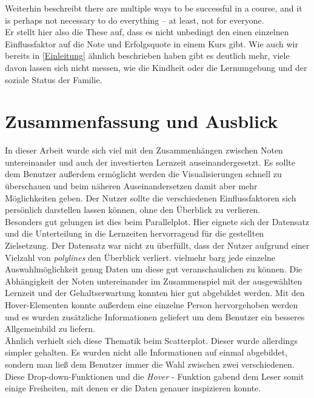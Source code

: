 \documentclass[usegeometry=true]{scrartcl}
\begin{document}
\noindent Weiterhin beschreibt \cite{Xu14, page 2}\: \glqq [...] there are multiple ways to be
successful in a course, and it is perhaps not necessary to do
everything – at least, not for everyone\grqq .\\
Er stellt hier also die These auf, dass es nicht unbedingt den einen einzelnen Einflussfaktor auf die Note und Erfolgsquote in einem Kurs gibt. Wie auch wir bereits in \ref{Einleitung} ähnlich beschrieben haben gibt es deutlich mehr, viele davon lassen sich nicht messen, wie die Kindheit oder die Lernumgebung und der soziale Status der Familie.





\section{Zusammenfassung und Ausblick}
In dieser Arbeit wurde sich viel mit den Zusammenhängen zwischen Noten untereinander und auch der investierten Lernzeit auseinandergesetzt. Es sollte dem Benutzer außerdem ermöglicht werden die Visualisierungen schnell zu überschauen und beim näheren Auseinandersetzen damit aber mehr Möglichkeiten geben. Der Nutzer sollte die verschiedenen Einflussfaktoren sich persönlich darstellen lassen können, ohne den Überblick zu verlieren.\\

\noindent Besonders gut gelungen ist dies beim Parallelplot. Hier eignete sich der Datensatz und die Unterteilung in die Lernzeiten hervorragend für die gestellten Zielsetzung. Der Datensatz war nicht zu überfüllt, dass der Nutzer aufgrund einer Vielzahl von \textit{polylines} den Überblick verliert. vielmehr barg jede einzelne Auswahlmöglichkeit genug Daten um diese gut veranschaulichen zu können. Die Abhängigkeit der Noten untereinander im Zusammenspiel mit der ausgewählten Lernzeit und der Gehaltserwartung konnten hier gut abgebildet werden. Mit den Hover-Elementen konnte außerdem eine einzelne Person hervorgehoben werden und es wurden zusätzliche Informationen geliefert um dem Benutzer ein besseres Allgemeinbild zu liefern.\\

\noindent  Ähnlich verhielt sich diese Thematik beim Scatterplot. Dieser wurde allerdings simpler gehalten. Es wurden nicht alle Informationen auf einmal abgebildet, sondern man ließ dem Benutzer immer die Wahl zwischen zwei verschiedenen. Diese Drop-down-Funktionen und die \textit{Hover} - Funktion gabend dem Leser somit einige Freiheiten, mit denen er die Daten genauer inspizieren konnte.\\
\end{document}
